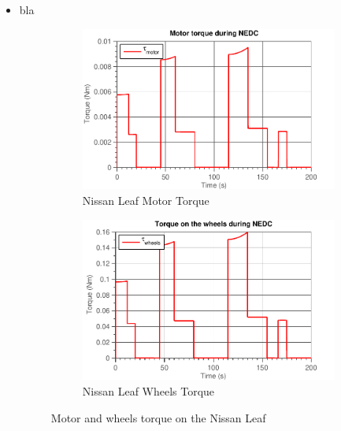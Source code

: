 \documentclass[11pt,titlepage]{report}
\begin{document}
\begin{enumerate}
\begin{itemize}
		\item
		bla

		\begin{figure}[H]
			\begin{center}
				\begin{subfigure}[h]{0.49\textwidth}
					\includegraphics[width=\textwidth]{resource/kitt/torque-motor-rc.pdf}
					\caption{Nissan Leaf Motor Torque}
					\label{fig:ass4-t1-torque-motor-kitt}
				\end{subfigure}
				\enspace
				\begin{subfigure}[h]{0.49\textwidth}
					\includegraphics[width=\textwidth]{resource/kitt/torque-wheels-rc.pdf}
					\caption{Nissan Leaf Wheels Torque}
					\label{fig:ass4-t1-torque-wheels-kitt}
				\end{subfigure}
			\end{center}
			\caption{Motor and wheels torque on the Nissan Leaf}
			\label{fig:ass4-t1-torque-kitt}
		\end{figure}


\end{itemize}
\end{enumerate}
\end{document}
